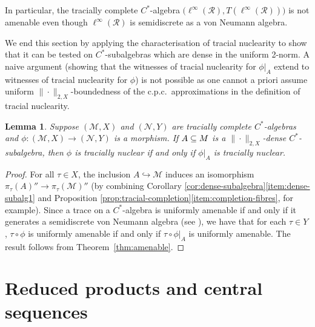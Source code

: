 \documentclass[a4paper,11pt]{amsart}
\newtheorem{lemma}[theorem]{Lemma}
\theoremstyle{definition}
\numberwithin{equation}{section}
\numberwithin{theorem}{section}
\newcommand{\R}{\mathcal R}
\newcommand{\M}{\mathcal{M}}
\begin{document}
In particular, the  tracially complete $C^*$-algebra $\big(\ell^\infty(\R), T(\ell^\infty(\R))\big)$ is not {}amenable even though $\ell^\infty(\R)$ is semidiscrete as a von Neumann algebra.

We end this section by applying the characterisation of tracial nuclearity to show that it can be tested on $C^*$-subalgebras which are dense in the uniform 2-norm. A naive argument (showing that the witnesses of tracial nuclearity for $\phi|_A$ extend to witnesses of tracial nuclearity for $\phi$) is not possible as one cannot a priori assume uniform $\|\cdot\|_{2,X}$-boundedness of the c.p.c.\ approximations in the definition of tracial nuclearity.


\begin{lemma}\label{lem:semidiscrete-dense}
	Suppose $(\mathcal M, X)$ and $(\mathcal N, Y)$ are tracially complete $C^*$-alge\-bras and $\phi \colon (\mathcal M , X) \rightarrow (\mathcal N, Y)$ is a morphism.  If $A \subseteq \mathcal \M$ is a $\|\cdot\|_{2, X}$-dense $C^*$-subalgebra, then $\phi$ is tracially nuclear if and only if $\phi|_A$ is tracially nuclear.
\end{lemma}

\begin{proof}
	For all $\tau \in X$, the inclusion $A \hookrightarrow \M$ induces an isomorphism $\pi_\tau(A)'' \rightarrow \pi_\tau(\M)''$ (by combining Corollary \ref{cor:dense-subalgebra}\ref{item:dense-subalg1} and Proposition \ref{prop:tracial-completion}\ref{item:completion-fibres}, for example).  Since a trace on a $C^*$-algebra is uniformly amenable if and only if it generates a semidiscrete von Neumann algebra (see \cite[Theorem~3.2.2(2)$\Leftrightarrow$(3)]{Bro06}), we have that for each $\tau \in Y$, $\tau \circ \phi$ is uniformly amenable if and only if $\tau \circ \phi|_A$ is uniformly amenable.  The result follows from Theorem~\ref{thm:amenable}.
\end{proof}



















\section{Reduced products and central sequences}
\label{sec:InductiveLimitsETC} 
\end{document}
